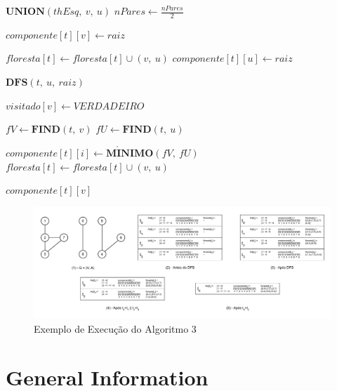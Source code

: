 \documentclass[12pt]{article}
\begin{document}
\begin{algorithm}
{{{                
                {
                    $\textbf{UNION}(thEsq,\ v,\ u)$\;
                }
            }
            $nPares \gets \frac{nPares}{2}$\;
        }
    }
    {
        $componente[t][v] \gets raiz$\;
        
        {
            $floresta[t] \gets floresta[t] \cup (v,\ u)$\;
            $componente[t][u] \gets raiz$\;
            
            {
                {
                    $\textbf{DFS}(t,\ u,\ raiz)$\;
                }
            }
        }
        $visitado[v] \gets VERDADEIRO$\;
    }
    {
        $fV \gets  \textbf{FIND}(t,\ v)$\;
        $fU \gets  \textbf{FIND}(t,\ u)$\;
        
        {
            {
                {
                    $componente[t][i] \gets \textbf{M} \acute{\textbf{I}} \textbf{NIMO}(fV,\ fU)$\;
                }
            }
            $floresta[t] \gets floresta[t] \cup (v,\ u)$\;
        }
    }
    {
        \Return $componente[t][v]$\;
    }
\end{algorithm}

\begin{figure}
\centering
\includegraphics[width=1\textwidth]{tabela_exe_par.pdf}
\caption{Exemplo de Execução do Algoritmo 3}
\label{fig:alg3}
\end{figure}

\section{General Information}
\end{document}
